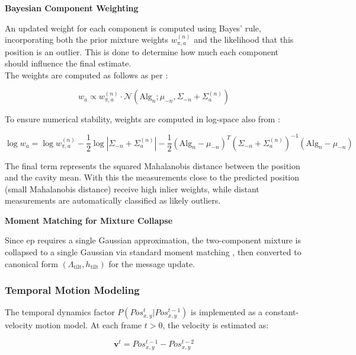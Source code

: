 \documentclass[12pt,a4paper]{article}
\begin{document}
\textbf{Bayesian Component Weighting}

An updated weight for each component is computed using Bayes' rule, incorporating both the prior mixture weights $w_{\pi,a}^{(n)}$ and the likelihood that this position is an outlier. This is done to determine how much each component should influence the final estimate.\\

The weights are computed as follows as per \parencite[pg.~438-439]{bishop2006prml}:

\begin{equation}
w_a \propto w_{\pi,a}^{(n)} \cdot \mathcal{N}(\text{Alg}_n; \mu_{-n}, \Sigma_{-n} + \Sigma_a^{(n)})
\end{equation}

To ensure numerical stability, weights are computed in log-space also from \parencite[pg.~438-439]{bishop2006prml}:

\begin{equation}
\log w_a = \log w_{\pi,a}^{(n)} - \frac{1}{2}\log|\Sigma_{-n} + \Sigma_a^{(n)}| - \frac{1}{2}(\text{Alg}_n - \mu_{-n})^T\left(\Sigma_{-n} + \Sigma_a^{(n)}\right)^{-1}(\text{Alg}_n - \mu_{-n})
\end{equation}

The final term represents the squared Mahalanobis distance between the position and the cavity mean. With this the measurements close to the predicted position (small Mahalanobis distance) receive high inlier weights, while distant measurements are automatically classified as likely outliers.

\textbf{Moment Matching for Mixture Collapse}

Since \acs{ep} requires a single Gaussian approximation, the two-component mixture is collapsed to a single Gaussian via standard moment matching \parencite{minka2001expectation}, then converted to canonical form $(\Lambda_{\text{tilt}}, h_{\text{tilt}})$ for the message update.

\subsubsection{Temporal Motion Modeling}
The temporal dynamics factor $P(Pos_{x,y}^t | Pos_{x,y}^{t-1})$ is implemented as a constant-velocity motion model. At each frame $t > 0$, the velocity is estimated as:

\begin{equation}
\mathbf{v}^t = Pos_{x,y}^{t-1} - Pos_{x,y}^{t-2}
\end{equation}
\end{document}
